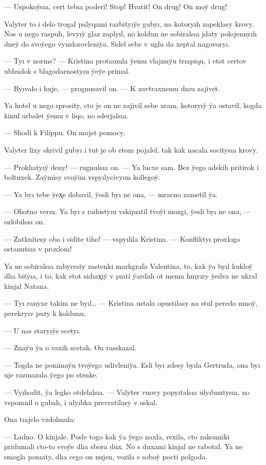 \documentclass[10pt]{book}
\begin{document}
— Uspokoy̆sıa, cert tebıa poderi! Stop! Hvatit! On drug! On moy̆ drug!



Valyter to i delo trogal palyqami razbityıy̆e gubyı, na kotoryıh zapeklasy krovy. Nos u nego raspuh, levyıy̆ glaz zaplyıl, no koldun ne sobiralsıa jdaty polojennyıh dney̆ do svoy̆ego vyızdorovleniy̆a. Sidel sebe v uglu da xeptal nagovoryı.

— Tyı v norme? — Kristina protıanula y̆emu vlajnuy̆u trıapiqu, i etot certov ublıudok s blagodarnostyıu y̆ey̆e prinıal.

— Byıvalo i huje, — prognusavil on. — K zavtraxnemu dnıu zajivet.

Ya hotel u nego sprosity, cto je on ne zajivil sebe xram, kotoryıy̆ y̆a ostavil, kogda kinul arbalet y̆emu v liqo, no sderjalsıa.

— Shodi k Filippu. On mojet pomocy.

Valyter lixy skrivil gubyı i tut je ob etom pojalel, tak kak nacala socitysıa krovy.

— Proklıatyıy̆ deny! — rugnulsıa on. — Ya lucxe sam. Bez y̆ego adskih pritirok i boltuxek. Zay̆misy svoy̆im vspyılycivyım kollegoy̆.

— Ya byı tebe y̆ex̨e dobavil, y̆esli byı ne ona, — mracno zametil y̆a.

— Ohotno verıu. Ya byı s radostyıu vskipıatil tvoy̆i mozgi, y̆esli byı ne ona, — ozlobilsıa on.

— Zatknitesy oba i sidite tiho! — vspyılila Kristina. — Konfliktyı proxlogo ostanutsıa v proxlom!

Ya ne sobiralsıa zabyıvaty zastenki markgrafa Valentina, to, kak y̆a byıl kukloy̆ dlıa bityıa, i to, kak etot sidıax̨iy̆ v pıati y̆ardah ot menıa hmyıry y̆edva ne ukral kinjal Natana.

— Tyı ranyxe takim ne byıl… — Kristina ustalo opustilasy na stul peredo mnoy̆, perekryıv puty k koldunu.

— U nas staryıy̆e scetyı.

— Znay̆u y̆a o vaxih scetah. On rasskazal.

— Togda ne ponimay̆u tvoy̆ego udivleniy̆a. Esli byı zdesy byıla Gertruda, ona byı uje razmazala y̆ego po stenke.

— Vyıhodit, y̆a legko otdelalsıa. — Valyter vnovy popyıtalsıa ulyıbnutysıa, no vspomnil o gubah, i ulyıbka prevratilasy v oskal.

Ona tıajelo vzdohnula:

— Ladno. O kinjale. Posle togo kak y̆a y̆ego naxla, rexila, cto zakonniki pridumali cto-to svoy̆e dlıa sbora dux. No s duxami kinjal ne rabotal. Ya ne smogla ponıaty, dlıa cego on nujen, vozila s soboy̆ pocti polgoda.
\end{document}
